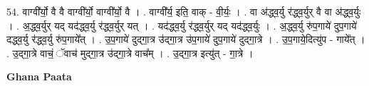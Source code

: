 \documentclass[17pt]{extarticle}
\begin{document}
54. वाग्वी᳚र्यो॒ वै वै वाग्वी᳚र्यो॒ वाग्वी᳚र्यो॒ वै । . वाग्वी᳚र्य॒ इति॒ वाक् - वी॒र्यः॒ । . वा अ॑द्ध्व॒र्यु र॑द्ध्व॒र्युर् वै वा अ॑द्ध्व॒र्युः । . अ॒द्ध्व॒र्युर् यद् यद॑द्ध्व॒र्यु र॑द्ध्व॒र्युर् यत् । . यद॑द्ध्व॒र्यु र॑द्ध्व॒र्युर् यद् यद॑द्ध्व॒र्युः । . अ॒द्ध्व॒र्यु रु॑प॒गाये॑ दुप॒गाये॑ दद्ध्व॒र्यु र॑द्ध्व॒र्यु रु॑प॒गाये᳚त् । . उ॒प॒गाये॑ दुद्‍गा॒त्र उ॑द्‍गा॒त्र उ॑प॒गाये॑ दुप॒गाये॑ दुद्‍गा॒त्रे । . उ॒प॒गाये॒दित्यु॑प - गाये᳚त् । . उ॒द्‍गा॒त्रे वाचं॒ ॅवाच॑ मुद्‍गा॒त्र उ॑द्‍गा॒त्रे वाच᳚म् । . उ॒द्‍गा॒त्र इत्यु॑त् - गा॒त्रे । \newline

\textbf{Ghana Paata } \newline
\end{document}
